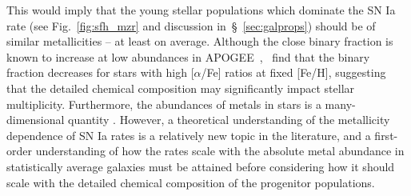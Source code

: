 \documentclass[ms.tex]{subfiles}
\begin{document}
This would imply that the young stellar populations which dominate the SN Ia
rate (see Fig.~\ref{fig:sfh_mzr} and discussion in~\S~\ref{sec:galprops})
should be of similar metallicities -- at least on average.
Although the close binary fraction is known to increase at low abundances
in APOGEE~\citep{Badenes2018, Moe2019},~\citet{Mazzola2020} find that the
binary fraction decreases for stars with high [$\alpha$/Fe] ratios at fixed
[Fe/H], suggesting that the detailed chemical composition may significantly
impact stellar multiplicity.
Furthermore, the abundances of metals in stars is a many-dimensional quantity
\citep[e.g.][]{Ting2022}.
However, a theoretical understanding of the metallicity dependence of SN Ia
rates is a relatively new topic in the literature, and a first-order
understanding of how the rates scale with the absolute metal abundance in
statistically average galaxies must be attained before considering how it
should scale with the detailed chemical composition of the progenitor
populations.
\end{document}
